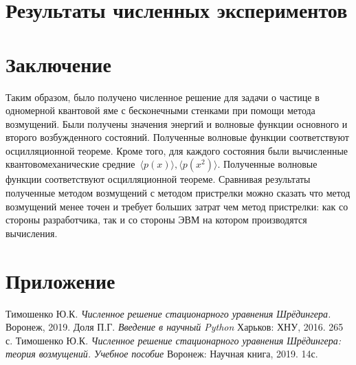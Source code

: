 \documentclass[a4paper,12pt]{article}
\begin{document}
\newpage

\section{Результаты численных экспериментов}\label{sec:results}


\section{Заключение}\label{sec:zakl}

Таким образом, было получено численное решение для задачи о частице в одномерной квантовой яме с бесконечными стенками при помощи метода возмущений.
Были получены значения энергий и волновые функции основного и второго возбужденного состояний.
Полученные волновые функции соответствуют осцилляционной теореме.
Кроме того, для каждого состояния были вычисленные квантовомеханические средние~$\langle p(x) \rangle, \langle p(x^2) \rangle$.
Полученные волновые функции соответствуют осцилляционной теореме.
Сравнивая результаты полученные методом возмущений с методом пристрелки можно сказать что метод возмущений менее точен и требует больших затрат чем метод пристрелки: как со стороны разработчика, так и со стороны ЭВМ на котором производятся вычисления.

\newpage

\appendix

\section*{Приложение}\label{sec:extras}



\newpage
\begin{thebibliography}{9}
 Тимошенко Ю.К. \textit{Численное решение стационарного уравнения Шрёдингера.} Воронеж, 2019.
 Доля П.Г. \textit{Введение в научный Python} Харьков: ХНУ, 2016. 265 с.
 Тимошенко Ю.К. \textit{Численное решение стационарного уравнения Шрёдингера: теория возмущений. Учебное пособие} Воронеж: Научная книга, 2019. 14с.
\end{thebibliography}
\end{document}
